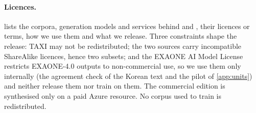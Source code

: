 \paragraph{Licences.}
 lists the corpora, generation models and services behind \bench and \model, their licences or terms, how we use them and what we release. Three constraints shape the release: TAXI may not be redistributed; the two \syn sources carry incompatible ShareAlike licences, hence two subsets; and the EXAONE AI Model License restricts EXAONE-4.0 outputs to non-commercial use, so we use them only internally (the agreement check of the \syn Korean text and the pilot of \cref{app:units}) and neither release them nor train on them. The commercial \syn edition is synthesised only on a paid Azure resource. No corpus used to train \model is redistributed.
